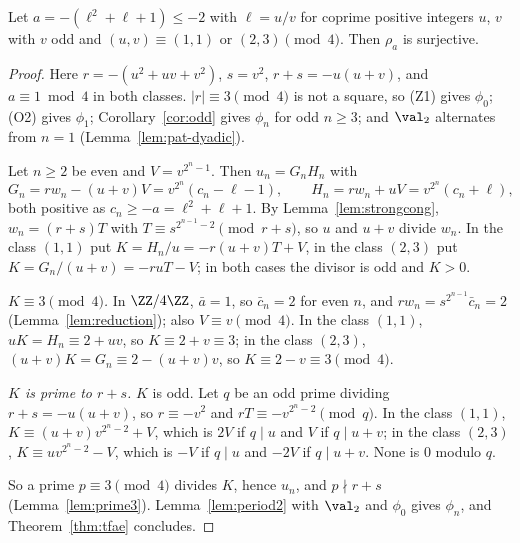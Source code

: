 \begin{theorem}
  \label{thm:famLi}
  \leanok
  Let $a = -(\ell^2 + \ell + 1) \le -2$ with $\ell = u/v$ for coprime positive integers $u$, $v$
  with $v$ odd and $(u, v) \equiv (1, 1)$ or $(2, 3) \pmod 4$. Then $\rho_a$ is surjective.
\end{theorem}
\begin{proof}
  \leanok
  Here $r = -(u^2 + uv + v^2)$, $s = v^2$, $r + s = -u(u + v)$, and $a \equiv 1 \bmod 4$ in both
  classes. $|r| \equiv 3 \pmod 4$ is not a square, so (Z1) gives $\phi_0$; (O2) gives
  $\phi_1$; Corollary~\ref{cor:odd} gives $\phi_n$ for odd $n \ge 3$; and $\val_2$
  alternates from $n = 1$ (Lemma~\ref{lem:pat-dyadic}).

  Let $n \ge 2$ be even and $V = v^{2^n - 1}$. Then $u_n = G_n H_n$ with
  \[ G_n = r w_n - (u + v) V = v^{2^n}(c_n - \ell - 1), \qquad
     H_n = r w_n + u V = v^{2^n}(c_n + \ell), \]
  both positive as $c_n \ge -a = \ell^2 + \ell + 1$. By Lemma~\ref{lem:strongcong},
  $w_n = (r + s) T$ with $T \equiv s^{2^{n-1} - 2} \pmod{r + s}$, so $u$ and $u + v$ divide $w_n$.
  In the class $(1, 1)$ put $K = H_n / u = -r(u + v) T + V$, in the class $(2, 3)$ put
  $K = G_n / (u + v) = -r u T - V$; in both cases the divisor is odd and $K > 0$.

  \emph{$K \equiv 3 \pmod 4$.} In $\ZZ/4\ZZ$, $\bar a = 1$, so $\bar c_n = 2$ for even $n$, and
  $r w_n = s^{2^{n-1}} \bar c_n = 2$ (Lemma~\ref{lem:reduction}); also $V \equiv v \pmod 4$. In the
  class $(1, 1)$, $uK = H_n \equiv 2 + uv$, so $K \equiv 2 + v \equiv 3$; in the class $(2, 3)$,
  $(u + v) K = G_n \equiv 2 - (u + v)v$, so $K \equiv 2 - v \equiv 3 \pmod 4$.

  \emph{$K$ is prime to $r + s$.} $K$ is odd. Let $q$ be an odd prime dividing $r + s = -u(u+v)$,
  so $r \equiv -v^2$ and $r T \equiv -v^{2^n - 2} \pmod q$. In the class $(1, 1)$,
  $K \equiv (u + v) v^{2^n - 2} + V$, which is $2V$ if $q \mid u$ and $V$ if $q \mid u + v$; in the
  class $(2, 3)$, $K \equiv u v^{2^n - 2} - V$, which is $-V$ if $q \mid u$ and $-2V$ if
  $q \mid u + v$. None is $0$ modulo $q$.

  So a prime $p \equiv 3 \pmod 4$ divides $K$, hence $u_n$, and $p \nmid r + s$
  (Lemma~\ref{lem:prime3}). Lemma~\ref{lem:period2} with $\val_2$ and $\phi_0$ gives
  $\phi_n$, and Theorem~\ref{thm:tfae} concludes.
\end{proof}

